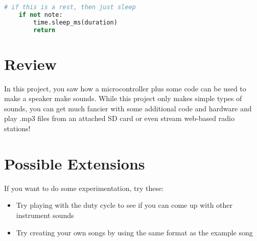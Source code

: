 \begin{lstlisting}[language=Python,caption=Using the sleep function]
    # if this is a rest, then just sleep
    if not note:
        time.sleep_ms(duration)
        return
\end{lstlisting}


\section{Review}

In this project, you saw how a microcontroller plus some code can be used to make
a speaker make sounds. While this project only makes simple types of sounds, you
can get much fancier with some additional code and hardware and play .mp3 files
from an attached SD card or even stream web-based radio stations!

\section{Possible Extensions}
If you want to do some experimentation, try these:

\begin{itemize}
    \item Try playing with the duty cycle to see if you can come up with other instrument sounds
    \item Try creating your own songs by using the same format as the example song
\end{itemize}
